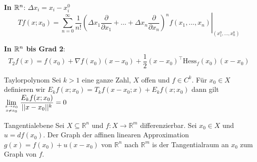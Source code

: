 \textbf{In $\mathbb{R}^n$}: $\Delta x_i = x_i - x_i^0$
\[
	Tf(x;x_0) = \left.\sum_{n=0}^\infty \frac{1}{n!}\left(\Delta x_1 \frac{\partial}{\partial x_1} + ... + \Delta x_n \frac{\partial}{\partial x_n} \right)^n 
		f(x_1, ..., x_n)\right|_{(x_1^0,...,x_n^0)}
\]

\textbf{In $\mathbb{R}^n$ bis Grad 2}:
\[
    T_2f(x) = f(x_0) + \nabla f(x_0)	 (x-x_0) + \frac{1}{2} (x-x_0)^\top \text{Hess}_f(x_0) (x-x_0) 
\]
\begin{Satz}{Taylorpolynom}{}
    Sei $k > 1$ eine ganze Zahl, $X$ offen und $f \in C^k$. Für $x_0 \in X$ definieren wir $E_kf(x;x_0) = T_kf(x - x_0; x) + E_kf(x;x_0)$
    dann gilt $
    \displaystyle\lim_{x \rightarrow x_0 \atop x\neq x_0}\frac{E_kf(x;x_0)}{||x-x_0||^k} =0$ 
\end{Satz}
\begin{Definition}{Tangentialebene}{}
    Sei $X \subseteq \mathbb{R}^n$ und $f: X \rightarrow \mathbb{R}^m$ differenzierbar.
    Sei $x_0 \in X$ und $u = df(x_0)$. Der Graph der affinen linearen Approximation
    $g(x) = f(x_0) + u(x - x_0)$ von $\mathbb{R}^n$ nach $\mathbb{R}^m$ is der Tangentialraum an $x_0$ zum Graph von $f$.
\end{Definition}
